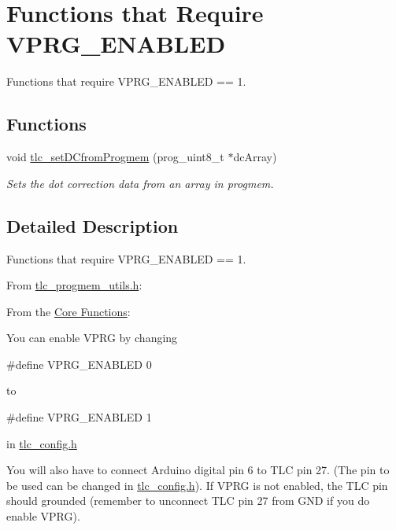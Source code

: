 \hypertarget{group__ReqVPRG__ENABLED}{}\section{Functions that Require V\+P\+R\+G\+\_\+\+E\+N\+A\+B\+L\+ED}
\label{group__ReqVPRG__ENABLED}


Functions that require V\+P\+R\+G\+\_\+\+E\+N\+A\+B\+L\+ED == 1.  


\subsection*{Functions}
\begin{DoxyCompactItemize}
\item 
void \hyperlink{group__ReqVPRG__ENABLED_ga0ee9aa27ddfa975fba5b1dbba1cced25}{tlc\+\_\+set\+D\+Cfrom\+Progmem} (prog\+\_\+uint8\+\_\+t $\ast$dc\+Array)
\begin{DoxyCompactList}\small\item\em Sets the dot correction data from an array in progmem. \end{DoxyCompactList}\end{DoxyCompactItemize}


\subsection{Detailed Description}
Functions that require V\+P\+R\+G\+\_\+\+E\+N\+A\+B\+L\+ED == 1. 

From \hyperlink{tlc__progmem__utils_8h}{tlc\+\_\+progmem\+\_\+utils.\+h}\+:

From the \hyperlink{group__CoreFunctions}{Core Functions}\+:

You can enable V\+P\+RG by changing 
\begin{DoxyCode}
\textcolor{preprocessor}{#define VPRG\_ENABLED    0 }
\end{DoxyCode}
 to 
\begin{DoxyCode}
\textcolor{preprocessor}{#define VPRG\_ENABLED    1 }
\end{DoxyCode}
 in \hyperlink{tlc__config_8h}{tlc\+\_\+config.\+h}

You will also have to connect Arduino digital pin 6 to T\+LC pin 27. (The pin to be used can be changed in \hyperlink{tlc__config_8h}{tlc\+\_\+config.\+h}). If V\+P\+RG is not enabled, the T\+LC pin should grounded (remember to unconnect T\+LC pin 27 from G\+ND if you do enable V\+P\+RG).


